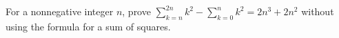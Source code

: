 For a nonnegative integer $n$, prove $\displaystyle\sum_{k=n}^{2n}k^2-\sum_{k=0}^{n}k^2=2n^3+2n^2$ without using the formula for a sum of squares.
